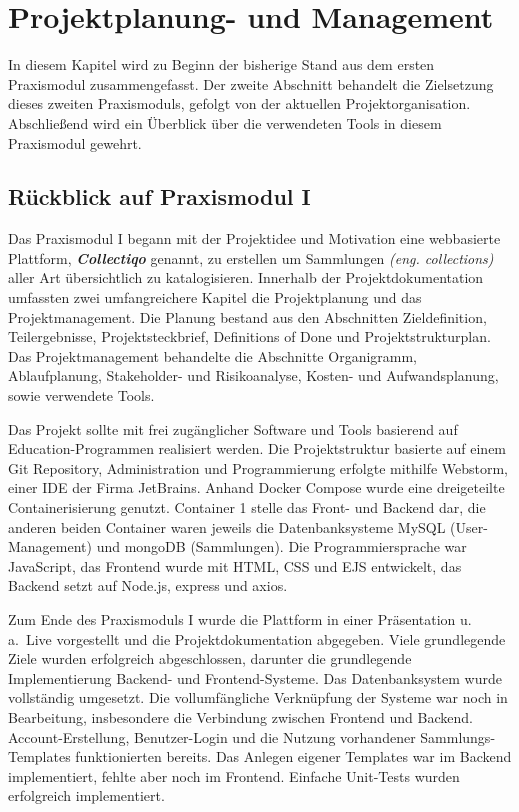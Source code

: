 \section{Projektplanung- und Management}\label{sec:section-one}

In diesem Kapitel wird zu Beginn der bisherige Stand aus dem ersten Praxismodul zusammengefasst.
Der zweite Abschnitt behandelt die Zielsetzung dieses zweiten Praxismoduls, gefolgt von der aktuellen Projektorganisation.
Abschließend wird ein Überblick über die verwendeten Tools in diesem Praxismodul gewehrt.

\subsection{Rückblick auf Praxismodul I}\label{subsec:subsection-one-one}

Das Praxismodul I begann mit der Projektidee und Motivation eine webbasierte Plattform, \textbf{\textit{Collectiqo}} genannt, zu erstellen um Sammlungen \textit{(eng. collections)} aller Art übersichtlich zu katalogisieren.
Innerhalb der Projektdokumentation umfassten zwei umfangreichere Kapitel die Projektplanung und das Projektmanagement.
Die Planung bestand aus den Abschnitten Zieldefinition, Teilergebnisse, Projektsteckbrief, Definitions of Done und Projektstrukturplan.
Das Projektmanagement behandelte die Abschnitte Organigramm, Ablaufplanung, Stakeholder- und Risikoanalyse, Kosten- und Aufwandsplanung, sowie verwendete Tools.

Das Projekt sollte mit frei zugänglicher Software und Tools basierend auf Education-Programmen realisiert werden.
Die Projektstruktur basierte auf einem Git Repository, Administration und Programmierung erfolgte mithilfe Webstorm, einer IDE der Firma JetBrains.
Anhand Docker Compose wurde eine dreigeteilte Containerisierung genutzt.
Container 1 stelle das Front- und Backend dar, die anderen beiden Container waren jeweils die Datenbanksysteme MySQL (User-Management) und mongoDB (Sammlungen).
Die Programmiersprache war JavaScript, das Frontend wurde mit HTML, CSS und EJS entwickelt, das Backend setzt auf Node.js, express und axios.

Zum Ende des Praxismoduls I wurde die Plattform in einer Präsentation u.\,a.\ Live vorgestellt und die Projektdokumentation abgegeben.
Viele grundlegende Ziele wurden erfolgreich abgeschlossen, darunter die grundlegende Implementierung Backend- und Frontend-Systeme.
Das Datenbanksystem wurde vollständig umgesetzt.
Die vollumfängliche Verknüpfung der Systeme war noch in Bearbeitung, insbesondere die Verbindung zwischen Frontend und Backend.
Account-Erstellung, Benutzer-Login und die Nutzung vorhandener Sammlungs-Templates funktionierten bereits.
Das Anlegen eigener Templates war im Backend implementiert, fehlte aber noch im Frontend.
Einfache Unit-Tests wurden erfolgreich implementiert.

